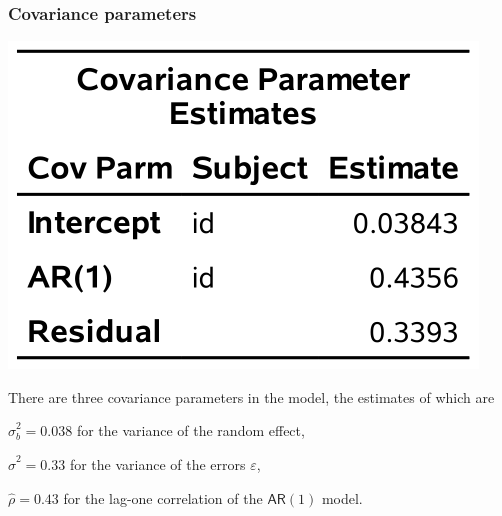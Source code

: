 \documentclass{beamer}
\begin{document}
\begin{frame}[fragile]
\frametitle{Covariance parameters}
\begin{center}
\includegraphics[width = 0.4\linewidth]{img/c6/slides7-e17}
\end{center}
There are three covariance parameters in the model, the estimates of which are 
\bi
\item $\hat{\sigma}^2_b=0.038$ for the variance of the random effect, 
\item $\hat{\sigma}^2=0.33$ for the variance of the errors $\varepsilon$, 
\item $\hat{\rho}=0.43$ for the lag-one correlation of the $\mathsf{AR}(1)$ model.
\ei
\end{frame}
\end{document}

